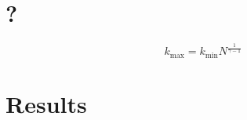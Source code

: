 \section{?}

    \[
        k_{\max} = k_{\min} N^{\frac{1}{\gamma-1}}
    \]

\section{Results}

    \begin{table}[H]
        \centering
        

        \caption{?}
        \label{tab:results}
    \end{table}

